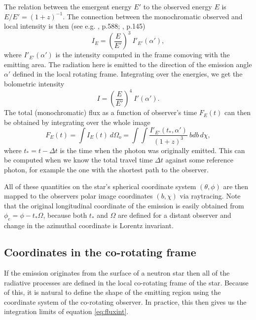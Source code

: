 \documentclass[iop, usenatbib]{emulateapj}
\newcommand{\be}{\begin{equation}}
\newcommand{\ee}{\end{equation}}
\begin{document}
The relation between the emergent energy $E'$ to the observed energy $E$ is $E/E' = (1 + z)^{-1}$.
The connection between the monochromatic observed and local intensity is then (see e.g. \citealt{MTW73}, p.588; \citealt{RL79}, p.145)
\be
I_E = \left( \frac{E}{E'} \right)^3 ~I'_{E'}(\alpha'),
\ee
where $I'_{E'}(\alpha')$ is the intensity computed in the frame comoving with the emitting area.
The radiation here is emitted to the direction of the emission angle $\alpha'$ defined in the local rotating frame.
Integrating over the energies, we get the bolometric intensity
\be
I = \left(\frac{E}{E'} \right)^4 ~I'(\alpha').
\ee
The total (monochromatic) flux as a function of observer's time $F_E(t)$ can then be obtained by integrating over the whole image
\be\label{eq:fluxint}
F_E(t) = \int I_{E}(t) ~d\Omega_o = \int\int \frac{I'_{E'}(t_*, \alpha')}{(1+z)^3}  ~bdb \, d\chi,
\ee
where $t_* = t - \Delta t$ is the time when the photon was originally emitted. 
This can be computed when we know the total travel time $\Delta t$ against some reference photon, for example the one with the shortest path to the observer.

All of these quantities on the star's spherical coordinate system $(\theta, \phi)$ are then mapped to the observers polar image coordinates $(b, \chi)$ via raytracing.
Note that the original longitudinal coordinate of the emission is easily obtained from $\phi_e = \phi - t_* \Omega$, because both $t_*$ and $\Omega$ are defined for a distant observer and change in the azimuthal coordinate is Lorentz invariant.


\subsection{Coordinates in the co-rotating frame}\label{sect:coords}
If the emission originates from the surface of a neutron star then all of the radiative processes are defined in the local co-rotating frame of the star.
Because of this, it is natural to define the shape of the emitting region using the coordinate system of the co-rotating observer.  
In practice, this then gives us the integration limits of equation \eqref{eq:fluxint}.
\end{document}
